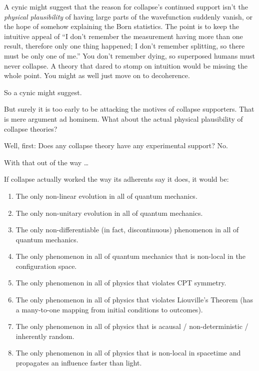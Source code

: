 {
 A cynic might suggest that the reason for
collapse's continued support isn't the
\textit{physical plausibility} of having large parts of the
wavefunction suddenly vanish, or the hope of somehow explaining the
Born statistics. The point is to keep the intuitive appeal of
``I don't remember the measurement
having more than one result, therefore only one thing happened; I
don't remember splitting, so there must be only one of
me.'' You don't remember dying, so
superposed humans must never collapse. A theory that dared to stomp on
intuition would be missing the whole point. You might as well just move
on to decoherence.}

{
 So a cynic might suggest.}

{
 But surely it is too early to be attacking the motives of collapse
supporters. That is mere argument ad hominem. What about the actual
physical plausibility of collapse theories?}

{
 Well, first: Does any collapse theory have any experimental
support? No.}

{
 With that out of the way \ldots}

{
 If collapse actually worked the way its adherents say it does, it
would be:}

\begin{enumerate}
\item {
 The only non-linear evolution in all of quantum mechanics.}

\item {
 The only non-unitary evolution in all of quantum mechanics.}

\item {
 The only non-differentiable (in fact, discontinuous) phenomenon in
all of quantum mechanics.}

\item {
 The only phenomenon in all of quantum mechanics that is non-local
in the configuration space.}

\item {
 The only phenomenon in all of physics that violates CPT symmetry.}

\item {
 The only phenomenon in all of physics that violates
Liouville's Theorem (has a many-to-one mapping from
initial conditions to outcomes).}

\item {
 The only phenomenon in all of physics that is acausal /
non-deterministic / inherently random.}

\item {
 The only phenomenon in all of physics that is non-local in
 spacetime and propagates an influence faster than light.}
\end{enumerate}

